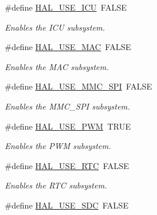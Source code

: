 \begin{DoxyCompactItemize}
\#define \hyperlink{group__HAL__CONF_gac58fde738d018b1233a5441ae4c6245b}{H\+A\+L\+\_\+\+U\+S\+E\+\_\+\+I\+CU}~F\+A\+L\+SE
\begin{DoxyCompactList}\small\item\em Enables the I\+CU subsystem. \end{DoxyCompactList}\item 
\hypertarget{group__HAL__CONF_ga0da24d012c72a79db22e5621b391d3da}{}\label{group__HAL__CONF_ga0da24d012c72a79db22e5621b391d3da} 
\#define \hyperlink{group__HAL__CONF_ga0da24d012c72a79db22e5621b391d3da}{H\+A\+L\+\_\+\+U\+S\+E\+\_\+\+M\+AC}~F\+A\+L\+SE
\begin{DoxyCompactList}\small\item\em Enables the M\+AC subsystem. \end{DoxyCompactList}\item 
\hypertarget{group__HAL__CONF_gafc4461ac2cc33590839ed91f2e940079}{}\label{group__HAL__CONF_gafc4461ac2cc33590839ed91f2e940079} 
\#define \hyperlink{group__HAL__CONF_gafc4461ac2cc33590839ed91f2e940079}{H\+A\+L\+\_\+\+U\+S\+E\+\_\+\+M\+M\+C\+\_\+\+S\+PI}~F\+A\+L\+SE
\begin{DoxyCompactList}\small\item\em Enables the M\+M\+C\+\_\+\+S\+PI subsystem. \end{DoxyCompactList}\item 
\hypertarget{group__HAL__CONF_gafb7a560610f96b2858d51c36d65f8c2f}{}\label{group__HAL__CONF_gafb7a560610f96b2858d51c36d65f8c2f} 
\#define \hyperlink{group__HAL__CONF_gafb7a560610f96b2858d51c36d65f8c2f}{H\+A\+L\+\_\+\+U\+S\+E\+\_\+\+P\+WM}~T\+R\+UE
\begin{DoxyCompactList}\small\item\em Enables the P\+WM subsystem. \end{DoxyCompactList}\item 
\hypertarget{group__HAL__CONF_ga17d20632810c9bb1601a19973977f55c}{}\label{group__HAL__CONF_ga17d20632810c9bb1601a19973977f55c} 
\#define \hyperlink{group__HAL__CONF_ga17d20632810c9bb1601a19973977f55c}{H\+A\+L\+\_\+\+U\+S\+E\+\_\+\+R\+TC}~F\+A\+L\+SE
\begin{DoxyCompactList}\small\item\em Enables the R\+TC subsystem. \end{DoxyCompactList}\item 
\hypertarget{group__HAL__CONF_ga06f315a18b911f426da736c42ab20325}{}\label{group__HAL__CONF_ga06f315a18b911f426da736c42ab20325} 
\#define \hyperlink{group__HAL__CONF_ga06f315a18b911f426da736c42ab20325}{H\+A\+L\+\_\+\+U\+S\+E\+\_\+\+S\+DC}~F\+A\+L\+SE

\end{DoxyCompactItemize}

